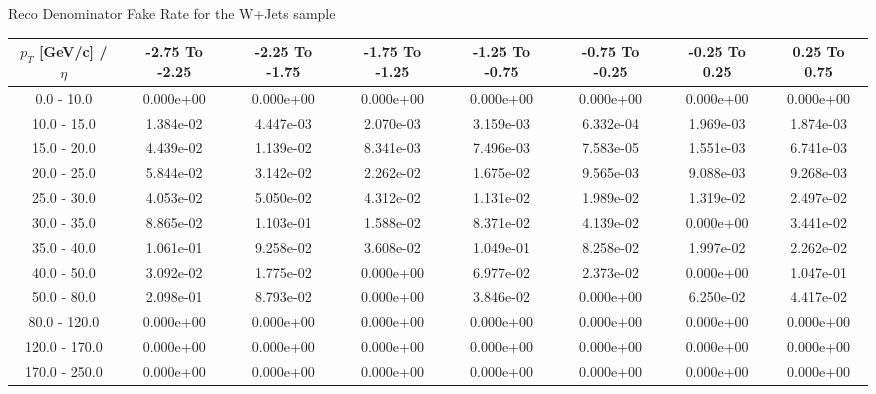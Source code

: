 \large 
Reco Denominator Fake Rate for the W+Jets sample
\footnotesize 
\begin{tabular*}{\textwidth}{|c|c|c|c|c|c|c|c|}\hline 
$p_T$ [GeV/c] / $\eta$  & -2.75 To -2.25 & -2.25 To -1.75 & -1.75 To -1.25 & -1.25 To -0.75 & -0.75 To -0.25 & -0.25 To 0.25 & 0.25 To 0.75 \\ 
 \hline 
0.0 - 10.0 & 0.000e+00 & 0.000e+00 & 0.000e+00 & 0.000e+00 & 0.000e+00 & 0.000e+00 & 0.000e+00 \\ 
10.0 - 15.0 & 1.384e-02 & 4.447e-03 & 2.070e-03 & 3.159e-03 & 6.332e-04 & 1.969e-03 & 1.874e-03 \\ 
15.0 - 20.0 & 4.439e-02 & 1.139e-02 & 8.341e-03 & 7.496e-03 & 7.583e-05 & 1.551e-03 & 6.741e-03 \\ 
20.0 - 25.0 & 5.844e-02 & 3.142e-02 & 2.262e-02 & 1.675e-02 & 9.565e-03 & 9.088e-03 & 9.268e-03 \\ 
25.0 - 30.0 & 4.053e-02 & 5.050e-02 & 4.312e-02 & 1.131e-02 & 1.989e-02 & 1.319e-02 & 2.497e-02 \\ 
30.0 - 35.0 & 8.865e-02 & 1.103e-01 & 1.588e-02 & 8.371e-02 & 4.139e-02 & 0.000e+00 & 3.441e-02 \\ 
35.0 - 40.0 & 1.061e-01 & 9.258e-02 & 3.608e-02 & 1.049e-01 & 8.258e-02 & 1.997e-02 & 2.262e-02 \\ 
40.0 - 50.0 & 3.092e-02 & 1.775e-02 & 0.000e+00 & 6.977e-02 & 2.373e-02 & 0.000e+00 & 1.047e-01 \\ 
50.0 - 80.0 & 2.098e-01 & 8.793e-02 & 0.000e+00 & 3.846e-02 & 0.000e+00 & 6.250e-02 & 4.417e-02 \\ 
80.0 - 120.0 & 0.000e+00 & 0.000e+00 & 0.000e+00 & 0.000e+00 & 0.000e+00 & 0.000e+00 & 0.000e+00 \\ 
120.0 - 170.0 & 0.000e+00 & 0.000e+00 & 0.000e+00 & 0.000e+00 & 0.000e+00 & 0.000e+00 & 0.000e+00 \\ 
170.0 - 250.0 & 0.000e+00 & 0.000e+00 & 0.000e+00 & 0.000e+00 & 0.000e+00 & 0.000e+00 & 0.000e+00 \\ 
 \hline 
\end{tabular*} 
